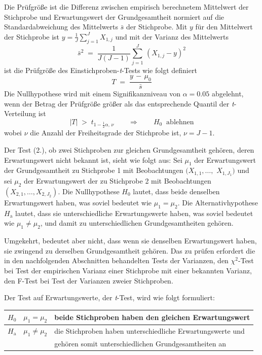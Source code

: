 Die Prüfgröße ist die Differenz zwischen empirisch berechnetem Mittelwert der Stichprobe
und Erwartungswert der Grundgesamtheit normiert auf die
Standardabweichung des Mittelwerts $\bar s$ der Stichprobe. Mit $y$ für den Mittelwert der
Stichprobe ist $y = \frac{1}{J}\sum_{j=1}^J X_{1,j}$ und mit der Varianz des Mittelwerts
\begin{equation}
\bar s^2 \; = \; \frac{1}{J (J - 1)} \sum_{j=1}^{J} \, (X_{1,j} - y)^2
\end{equation}
ist die Prüfgröße des Einstichproben-\textsl{t}-Tests wie folgt definiert
\begin{equation}
T \; = \; \frac{y \, - \, \mu_0}{\bar s}
\label{tTestonesample}
\end{equation}
Die Nullhypothese wird mit einem Signifikanzniveau von $\alpha = 0.05$ abgelehnt, wenn
der Betrag der Prüfgröße größer als das entsprechende Quantil der \textsl{t}-Verteilung ist
\begin{equation}
|T| \; > \; t_{1-\frac{1}{2} \alpha, \, \nu} \qquad \Rightarrow \qquad H_0 \; \; \mathrm{ablehnen}
\end{equation}
wobei $\nu$ die Anzahl der Freiheitsgrade der Stichprobe ist, $\nu = J-1$.

Der Test (2.), ob zwei Stichproben zur gleichen Grundgesamtheit gehören,
 deren Erwartungswert nicht bekannt ist, sieht wie folgt aus:
Sei $\mu_1$ der Erwartungswert der Grundgesamtheit zu Stichprobe 1 mit
Beobachtungen $(X_{1,1},\dots,$ $X_{1,J_1})$ und sei $\mu_2$ der Erwartungswert der
zu Stichprobe 2 mit Beobachtungen $(X_{2,1}, \dots, X_{2,J_2})$.
Die Nullhypothese $H_0$ lautet, dass beide denselben Erwartungswert haben,
was soviel bedeutet wie $\mu_1 = \mu_2$. Die Alternativhypothese $H_\mathrm{a}$
lautet, dass sie unterschiedliche Erwartungswerte haben, was soviel bedeutet wie $\mu_1 \neq \mu_2$,
und damit zu unterschiedlichen Grundgesamtheiten gehören.

Umgekehrt, bedeutet aber nicht, dass wenn sie denselben Erwartungswert haben,
sie zwingend zu derselben Grundgesamtheit gehören. Das zu prüfen erfordert die
in den nachfolgenden Abschnitten behandelten Tests der Varianzen, den $\chi^2$-Test bei
Test der empirischen Varianz einer Stichprobe mit einer bekannten Varianz, den
F-Test bei Test der Varianzen zweier Stichproben.

Der Test auf Erwartungswerte, der \textsl{t}-Test, wird wie folgt formuliert:
\begin{center}
\setlength{\extrarowheight}{.5em}
\begin{tabular}{c|cl}
$H_0$ & $\mu_1 = \mu_2$ & beide Stichproben haben den gleichen Erwartungswert\\
\hline
$H_\mathrm{a}$ & $\mu_1 \neq \mu_2$ & die Stichproben haben unterschiedliche Erwartungswerte und\\
 & & gehören somit unterschiedlichen Grundgesamtheiten an
\end{tabular}
\end{center}

